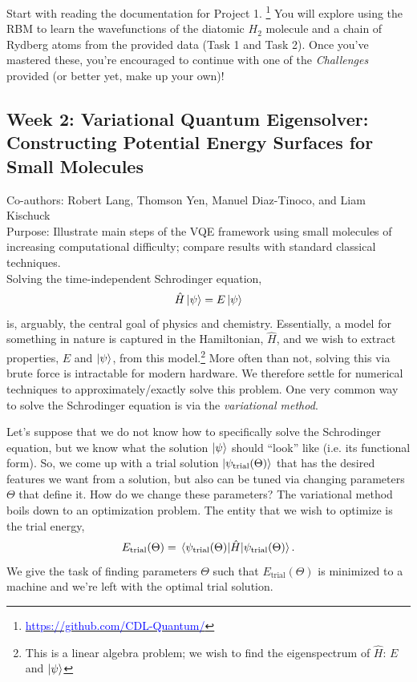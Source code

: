\documentclass[12pt]{article}
\begin{document}
Start with reading the documentation for Project 1.
\footnote{\href{https://github.com/CDL-Quantum/CohortProject_2020/tree/master/Project_1_RBM_and_Tomography}
    {\textcolor{blue}{https://github.com/CDL-Quantum/}}}
You will explore using the RBM to learn the wavefunctions of the diatomic $H_2$ molecule
and a chain of Rydberg atoms from the provided data (Task 1 and Task 2).
Once you've mastered these, you're encouraged to continue with one of the {\it Challenges} provided (or better yet, make up your own)!

\newpage


\subsection{Week 2: Variational Quantum Eigensolver: Constructing Potential Energy Surfaces for Small Molecules}

Co-authors: Robert Lang, Thomson Yen, Manuel Diaz-Tinoco, and Liam Kischuck
\\
Purpose: Illustrate main steps of the VQE framework using small molecules of increasing computational difficulty; compare results with standard classical techniques.
\newline \\

Solving the time-independent Schrodinger equation,
\begin{equation}
    \hat{H}\ket{\psi} = E\ket{\psi}
\end{equation}
is, arguably, the central goal of physics and chemistry. Essentially, a model for something in nature is captured in the Hamiltonian, $\hat{H}$, and we wish to extract properties, $E$ and $\ket{\psi}$, from this model.\footnote{This is a linear algebra problem; we wish to find the eigenspectrum of $\hat{H}$: $E$ and $\ket{\psi}$} More often than not, solving this via brute force is intractable for modern hardware. We therefore settle for numerical techniques to approximately/exactly solve this problem. One very common way to solve the Schrodinger equation is via the {\it variational method}.

Let's suppose that we do not know how to specifically solve the Schrodinger equation, but we know what the solution $\ket{\psi}$ should ``look'' like (i.e. its functional form).
So, we come up with a trial solution $\ket{\psi_{\text{trial}}(\Theta)}$ that has the desired features we want from a solution, but also can be tuned via changing parameters $\Theta$ that define it.
How do we change these parameters?
The variational method boils down to an optimization problem. 
The entity that we wish to optimize is the trial energy,
\begin{equation}
    E_{\text{trial}}(\Theta) = \mel{\psi_{\text{trial}}(\Theta)}{\hat{H}}{\psi_{\text{trial}}(\Theta)}.
\end{equation}
We give the task of finding parameters $\Theta$ such that $E_{\text{trial}}(\Theta)$ is minimized to a machine and we're left with the optimal trial solution.
\end{document}

